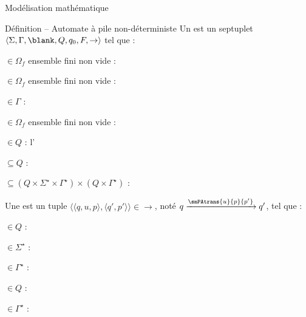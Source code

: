 
\begingroup

\begin{frame}{Modélisation mathématique}

  \vspace{-2mm}
  \begin{block}{Définition -- Automate à pile non-déterministe}
    Un  est un septuplet \alert{$\langle \Sigma, \Gamma, \blank, Q, q_0, F, \rightarrow \rangle$} tel que :
    \begin{description}[xxxx]
    \item[\alert{$\Sigma$}] $\in \Omega_f$ ensemble fini non vide : 
    \item[\alert{$\Gamma$}] $\in \Omega_f$ ensemble fini non vide : 
    \item[\alert{$\blank$}] $\in \Gamma$ : 
    \item[\alert{$Q$}] $\in \Omega_f$ ensemble fini non vide : 
    \item[\alert{$q_0$}] $\in Q$ : l'
    \item[\alert{$F$}] $\subseteq Q$ : 
    \item[\alert{$\rightarrow$}] $\subseteq  (Q \times \Sigma^\star \times \Gamma^\star) \times (Q \times \Gamma^\star)$ : 
    \end{description}

    \vspace{-1mm}
    Une  est un tuple \alert{$\langle \langle q, u, p \rangle, \langle q', p' \rangle \rangle \in \rightarrow$}, noté \alert{$q \xrightarrow{\smPAtrans{u}{p}{p'}} q'$}, tel que :
    \begin{description}[xxxx]
    \item[\alert{$q$}] $\in Q$ : 
    \item[\alert{$u$}] $\in \Sigma^\star$ : 
    \item[\alert{$p$}] $\in \Gamma^\star$ : 
    \item[\alert{$q'$}] $\in Q$ : 
    \item[\alert{$p'$}] $\in \Gamma^\star$ : 
    \end{description}
  \end{block}


\end{frame}

\endgroup
\endinput

